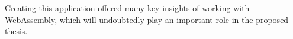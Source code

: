 Creating this application offered many key insights of working with WebAssembly, which will undoubtedly play an important role in the proposed thesis. 







